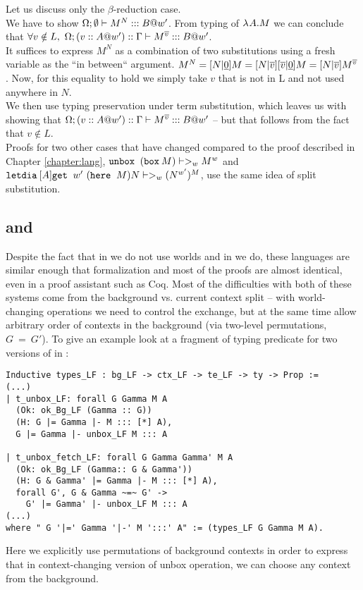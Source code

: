 Let us discuss only the $\beta$-reduction case.\\
We have to show $\Omega; \mbox{$\emptyset$} |- M ^ N ::: B @ w'$. From typing of $\mbox{$\lambda_{} A . M$}$ we can conclude that
$\forall v \notin L,\ \Omega; (v :: A @ w') :: \Gamma |- M ^ {\overline{v}} ::: B @ w'$.\\
It suffices to express $M ^ N$ as a combination of two substitutions using a fresh variable as the ``in between`` argument. $ M ^ N = \mbox{$ [N | \underline{0}] M$} = \mbox{$ [N | \overline{v}] \mbox{$ [\overline{v} | \underline{0}] M$}$} = \mbox{$ [N | \overline{v}] M ^ {\overline{v}}$}$. Now, for this equality to hold we simply take $v$ that is not in L and not used anywhere in $N$.\\
We then use typing preservation under term substitution, which leaves us with showing that $\Omega; (v :: A @ w') :: \Gamma |- M ^ {\overline{v}} ::: B @ w'$ -- but that follows from the fact that $ v \notin L$.\\
Proofs for two other cases that have changed compared to the proof described in Chapter \ref{chapter:lang}, $\mbox{$\operatorname{\texttt{unbox}}_{}\ {(}$}\mbox{$\operatorname{\texttt{box}}_{} {M}$}) |->_{w} M ^ w$ and $\mbox{$\operatorname{\texttt{letdia}}_{} {[A]}{\mbox{$\operatorname{\texttt{get}}_{}\ {w'}\ {(}$}\mbox{$\operatorname{\texttt{here}}_{}\ {M}$})}$} N |->_w (N ^ {w'}) ^M$, use the same idea of split substitution.

\subsection{\langLF{} and \langHyb{}}
Despite the fact that in \langLF{} we do not use worlds and in \langHyb{} we do, these languages are similar enough that formalization and most of the proofs are almost identical, even in a proof assistant such as Coq. Most of the difficulties with both of these systems come from the background vs. current context split -- with world-changing operations we need to control the exchange, but at the same time allow arbitrary order of contexts in the background (via two-level permutations, $ G ~=~ G'$). To give an example look at a fragment of typing predicate for two versions of \unboxe{} in \langLF{}:
\begin{verbatim}
Inductive types_LF : bg_LF -> ctx_LF -> te_LF -> ty -> Prop :=
(...)
| t_unbox_LF: forall G Gamma M A
  (Ok: ok_Bg_LF (Gamma :: G))
  (H: G |= Gamma |- M ::: [*] A),
  G |= Gamma |- unbox_LF M ::: A

| t_unbox_fetch_LF: forall G Gamma Gamma' M A
  (Ok: ok_Bg_LF (Gamma:: G & Gamma'))
  (H: G & Gamma' |= Gamma |- M ::: [*] A),
  forall G', G & Gamma ~=~ G' ->
    G' |= Gamma' |- unbox_LF M ::: A
(...)
where " G '|=' Gamma '|-' M ':::' A" := (types_LF G Gamma M A).
\end{verbatim}
Here we explicitly use permutations of background contexts in order to express that in context-changing version of unbox operation, we can choose any context from the background.\\

